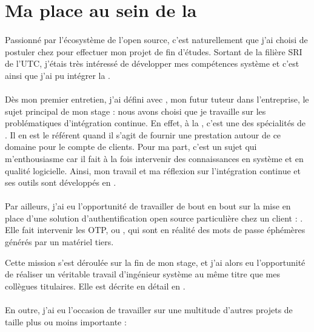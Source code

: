 \section{Ma place au sein de la \abusys}

\paragraph{}
Passionné par l'écosystème de l'open source, c'est naturellement que j'ai choisi de postuler chez \asmile{} pour effectuer mon projet de fin d'études.
Sortant de la filière SRI de l'UTC, j'étais très intéressé de développer mes compétences système et c'est ainsi que j'ai pu intégrer la \abusys{}.

\paragraph{}
Dès mon premier entretien, j'ai défini avec \agulet{}, mon futur tuteur dans l'entreprise, le sujet principal de mon stage : nous avons choisi que je travaille sur les problématiques d'intégration continue.
En effet, à la \abusys{}, c'est une des spécialités de \agulet{}.
Il en est le référent quand il s'agit de fournir une prestation autour de ce domaine pour le compte de clients.
Pour ma part, c'est un sujet qui m'enthousiasme car il fait à la fois intervenir des connaissances en système et en qualité logicielle.
Ainsi, mon travail et ma réflexion sur l'intégration continue et ses outils sont développés en .

\paragraph{}
Par ailleurs, j'ai eu l'opportunité de travailler de bout en bout sur la mise en place d'une solution d'authentification open source particulière chez un client : \alinotp.
Elle fait intervenir les OTP, ou , qui sont en réalité des mots de passe éphémères générés par un matériel tiers.

Cette mission s'est déroulée sur la fin de mon stage, et j'ai alors eu l'opportunité de réaliser un véritable travail d'ingénieur système au même titre que mes collègues titulaires.
Elle est décrite en détail en .

\paragraph{}
En outre, j'ai eu l'occasion de travailler sur une multitude d'autres projets de taille plus ou moins importante :

